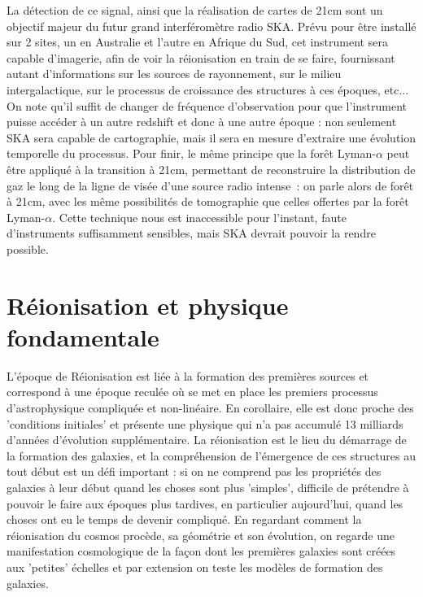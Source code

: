 La détection de ce signal, ainsi que la réalisation de cartes de 21cm sont un objectif majeur du futur grand interféromètre radio SKA. Prévu pour être installé sur 2 sites, un en Australie et l'autre en Afrique du Sud, cet instrument sera capable d'imagerie, afin de voir la réionisation en train de se faire, fournissant autant d'informations sur les sources de rayonnement, sur le milieu intergalactique, sur le processus de croissance des structures à ces époques, etc... On note qu'il suffit de changer de fréquence d'observation pour que l'instrument puisse accéder à un autre redshift et donc à une autre époque : non seulement SKA sera capable de cartographie, mais il sera en mesure d'extraire une évolution temporelle du processus. Pour finir, le même principe que la forêt Lyman-$\alpha$ peut être appliqué à la transition à 21cm, permettant de reconstruire la distribution de gaz le long de la ligne de visée d'une source radio intense~: on parle alors de forêt à 21cm, avec les même possibilités de tomographie que celles offertes par la forêt Lyman-$\alpha$. Cette technique nous est inaccessible pour l'instant, faute d'instruments suffisamment sensibles, mais SKA devrait pouvoir la rendre possible. 

\section{Réionisation et physique fondamentale}
L'époque de Réionisation est liée à la formation des premières sources et correspond à une époque reculée où se met en place les premiers processus d'astrophysique compliquée et non-linéaire. En corollaire, elle est donc proche des 'conditions initiales' et présente une physique qui n'a pas accumulé 13 milliards d'années d'évolution supplémentaire. La réionisation est le lieu du démarrage de la formation des galaxies, et la compréhension de l'émergence de ces structures au tout début est un défi important : si on ne comprend pas les propriétés des galaxies à leur début quand les choses sont plus 'simples', difficile de prétendre à pouvoir le faire aux époques plus tardives, en particulier aujourd'hui, quand les choses ont eu le temps de devenir compliqué. En regardant comment la réionisation du cosmos procède, sa géométrie et son évolution, on regarde une manifestation cosmologique de la façon dont les premières galaxies sont créées aux 'petites' échelles et par extension on teste les modèles de formation des galaxies.

